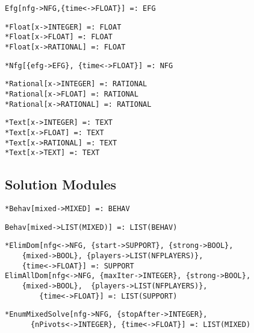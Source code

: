 \protect \large \begin{verbatim}
Efg[nfg->NFG,{time<->FLOAT}] =: EFG
\end{verbatim}\normalsize


\protect \large \begin{verbatim}
*Float[x->INTEGER] =: FLOAT
*Float[x->FLOAT] =: FLOAT
*Float[x->RATIONAL] =: FLOAT
\end{verbatim} \normalsize

\protect \large \begin{verbatim}
*Nfg[{efg->EFG}, {time<->FLOAT}] =: NFG
\end{verbatim}\normalsize

\protect \large \begin{verbatim}
*Rational[x->INTEGER] =: RATIONAL
*Rational[x->FLOAT] =: RATIONAL
*Rational[x->RATIONAL] =: RATIONAL
\end{verbatim} \normalsize

\protect \large \begin{verbatim}
*Text[x->INTEGER] =: TEXT
*Text[x->FLOAT] =: TEXT
*Text[x->RATIONAL] =: TEXT
*Text[x->TEXT] =: TEXT
\end{verbatim} \normalsize



\medskip
\subsection{Solution Modules}

\protect \large \begin{verbatim}
*Behav[mixed->MIXED] =: BEHAV
\end{verbatim}\normalsize

\protect \large \begin{verbatim}
Behav[mixed->LIST(MIXED)] =: LIST(BEHAV)
\end{verbatim}\normalsize

\protect \large \begin{verbatim}
*ElimDom[nfg<->NFG, {start->SUPPORT}, {strong->BOOL}, 
	{mixed->BOOL}, {players->LIST(NFPLAYERS)}, 
	{time<->FLOAT}] =: SUPPORT
ElimAllDom[nfg<->NFG, {maxIter->INTEGER}, {strong->BOOL}, 
	{mixed->BOOL},	{players->LIST(NFPLAYERS)},
        {time<->FLOAT}] =: LIST(SUPPORT)
\end{verbatim} \normalsize

\protect \large \begin{verbatim}
*EnumMixedSolve[nfg->NFG, {stopAfter->INTEGER},
      {nPivots<->INTEGER}, {time<->FLOAT}] =: LIST(MIXED)
\end{verbatim}\normalsize

